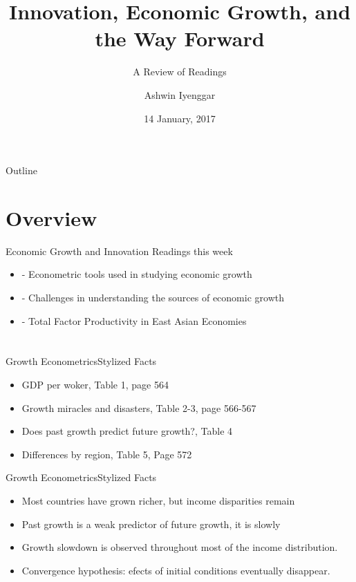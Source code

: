 \documentclass{beamer}
\title{Innovation, Economic Growth, and the Way Forward}
\subtitle{A Review of Readings}
\author{Ashwin Iyenggar}
\institute[Indian Institute of Management Bangalore] 
{
  Corporate Strategy and Policy\\
  Indian Institute of Management Bangalore
}
\date{14 January, 2017}
\begin{document}
\begin{frame}
  \titlepage
\end{frame}

\begin{frame}{Outline}
  \tableofcontents
\end{frame}

\section{Overview}
\begin{frame}{Economic Growth and Innovation}{}
Readings this week
\begin{itemize}
\item{\cite{Durlauf2005}} - Econometric tools used in studying economic growth
\item{\cite{Abramovitz1993}} - Challenges in understanding the sources of economic growth
\item{\cite{Young1994}} - Total Factor Productivity in East Asian Economies
\end{itemize}
\end{frame}

\section{\cite{Durlauf2005}}
\begin{frame}{Growth Econometrics}{Stylized Facts}
\begin{itemize}
\item{GDP per woker, Table 1, page 564}
\item{Growth miracles and disasters, Table 2-3, page 566-567}
\item{Does past growth predict future growth?, Table 4}
\item{Differences by region, Table 5, Page 572}
\end{itemize}
\end{frame}

\begin{frame}{Growth Econometrics}{Stylized Facts}
\begin{itemize}
\item{Most countries have grown richer, but income disparities remain}
\item{Past growth is a weak predictor of future growth, it is slowly}
\item{Growth slowdown is observed throughout most of the income distribution.}
\item{Convergence hypothesis: efects of initial conditions eventually disappear.}
\end{itemize}
\end{frame}
\end{document}
